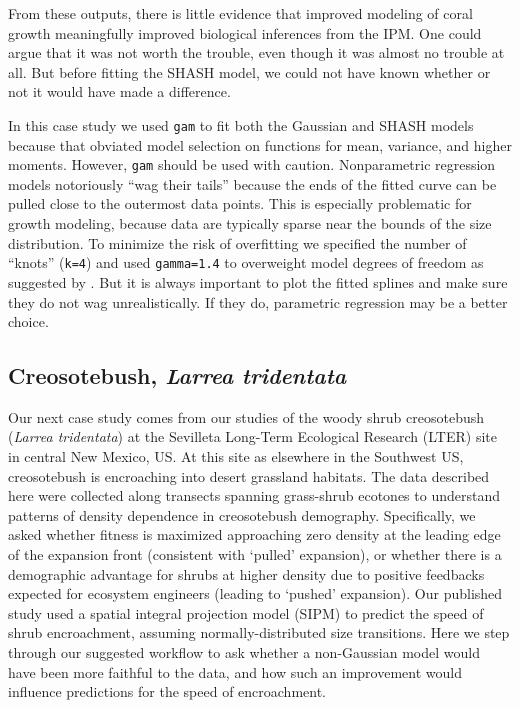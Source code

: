 \documentclass[12pt]{article}
\begin{document}
From these outputs, there is little evidence that improved modeling of coral growth meaningfully improved biological inferences from the IPM. 
One could argue that it was not worth the trouble, even though it was almost no trouble at all. But before 
fitting the SHASH model, we could not have known whether or not it would have made a difference.

In this case study we used \texttt{gam} to fit both the Gaussian and SHASH models because that obviated model selection on functions for mean, variance, and higher moments. 
However, \texttt{gam} should be used with caution. 
Nonparametric regression models notoriously ``wag their tails'' because the ends of the fitted curve can be pulled close to the outermost data points. 
This is especially problematic for growth modeling, because data are typically sparse near the bounds of the size distribution. 
To minimize the risk of overfitting we specified the number of ``knots'' (\texttt{k=4}) and used \texttt{gamma=1.4} to overweight model degrees of freedom as suggested by \citet[][sec. 3.2]{gu-2013}. 
But it is always important to plot the fitted splines and make sure they do not wag unrealistically. 
If they do, parametric regression may be a better choice. 

\subsection{Creosotebush, \emph{Larrea tridentata}}
\label{sec:creosotebush}
Our next case study comes from our studies of the woody shrub creosotebush (\emph{Larrea tridentata}) at the Sevilleta Long-Term Ecological Research (LTER) site in central New Mexico, US. 
At this site as elsewhere in the Southwest US, creosotebush is encroaching into desert grassland habitats.
The data described here were collected along transects spanning grass-shrub ecotones to understand patterns of density dependence in creosotebush demography.
Specifically, we asked whether fitness is maximized approaching zero density at the leading edge of the expansion front (consistent with `pulled' expansion), or whether there is a demographic advantage for shrubs at higher density due to positive feedbacks expected for ecosystem engineers (leading to `pushed' expansion). 
Our published study \citep{drees2023demography} used a spatial integral projection model (SIPM) to predict the speed of shrub encroachment, assuming normally-distributed size transitions. 
Here we step through our suggested workflow to ask whether a non-Gaussian model would have been more faithful to the data, and how such an improvement would influence predictions for the speed of encroachment.
\end{document}
